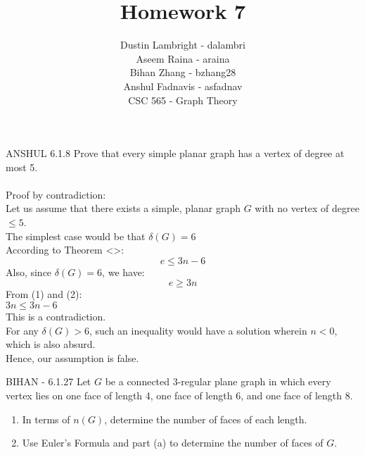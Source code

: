 \documentclass[12pt]{article}
\newenvironment{question}[2][Question]{\begin{trivlist}
\item[\hskip \labelsep {\bfseries #1}\hskip \labelsep {\bfseries #2.}]}{\end{trivlist}}
\begin{document}


\title{Homework 7}%
\author{Dustin Lambright - dalambri \\ Aseem Raina - araina \\ Bihan Zhang - bzhang28 \\ Anshul Fadnavis - asfadnav\\
CSC 565 - Graph Theory} %

\maketitle


\begin{question}{1} - \color{blue} ANSHUL \color{black}
6.1.8  Prove that every simple planar graph has a vertex of degree at most 5.\\
\\
Proof by contradiction:\\
Let us assume that there exists a simple, planar graph $G$ with no vertex of degree $\leq 5$.\\
The simplest case would be that $\delta(G) = 6$\\
According to Theorem <>:\\
\begin{equation}
e \leq 3n - 6
\end{equation}
Also, since $\delta(G) = 6$, we have:\\
\begin{equation}
e \geq 3n
\end{equation}
From (1) and (2):\\\indent$3n \leq 3n - 6$\\
This is a contradiction.\\
For any $\delta(G) > 6$, such an inequality would have a solution wherein  $n < 0$, which is also absurd.\\
Hence, our assumption is false.
\end{question}

\begin{question}{2} - \color{blue}BIHAN\color{black} - 
6.1.27  Let $G$ be a connected 3-regular plane graph in which every vertex lies on one face of length 4, one face of length 6, and one face of length 8.
\begin{enumerate}[label=\alph*)]
  \item In terms of $n(G)$, determine the number of faces of each length.
  \item Use Euler's Formula and part (a) to determine the number of faces of $G$.
\end{enumerate}
\end{question}
\end{document}
